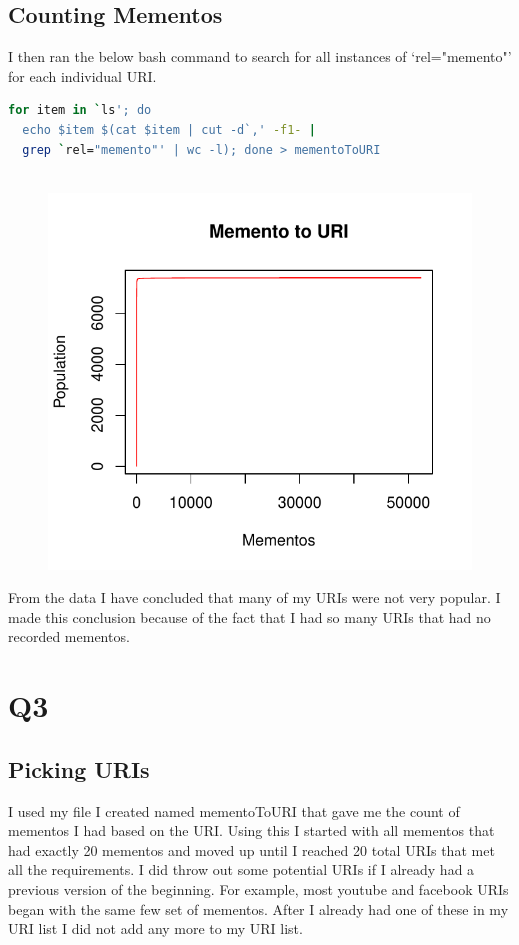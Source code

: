 \documentclass[12pt]{article}
\begin{document}
\subsection{Counting Mementos}
I then ran the below bash command to search for all instances of `rel="memento"' for each individual URI.

\begin{lstlisting}[language=bash]
for item in `ls'; do 
  echo $item $(cat $item | cut -d`,' -f1- | 
  grep `rel="memento"' | wc -l); done > mementoToURI
\end{lstlisting}

\begin{figure}[H]
    \centering
    \includegraphics[scale=0.7]{mementoCount.pdf}
\end{figure}

From the data I have concluded that many of my URIs were not very popular. I made this conclusion because of the fact that I had so many URIs that had no recorded mementos. 

\section{Q3}
\subsection{Picking URIs}
I used my file I created named mementoToURI that gave me the count of mementos I had based on the URI.  Using this I started with all mementos that had exactly 20 mementos and moved up until I reached 20 total URIs that met all the requirements.  I did throw out some potential URIs if I already had a previous version of the beginning.  For example, most youtube and facebook URIs began with the same few set of mementos.  After I already had one of these in my URI list I did not add any more to my URI list.
\end{document}
